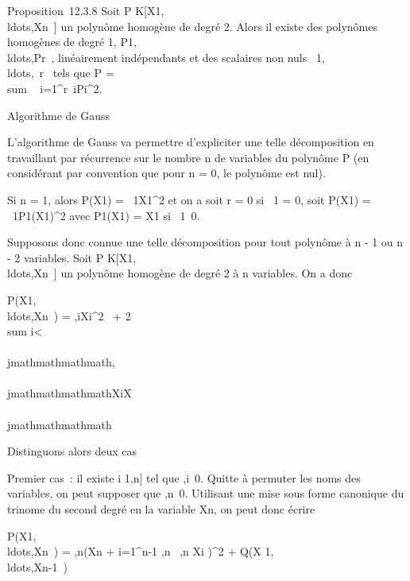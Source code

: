 Proposition~12.3.8 Soit P \in
K{[}X1,\\ldots,Xn~{]}
un polynôme homogène de degré 2. Alors il existe des polynômes homogènes
de degré 1,
P1,\\ldots,Pr~,
linéairement indépendants et des scalaires non nuls
\alpha~1,\\ldots,\alpha~r~
tels que P = \\sum ~
i=1^r\alpha~iPi^2.

Algorithme de Gauss

L'algorithme de Gauss va permettre d'expliciter une telle décomposition
en travaillant par récurrence sur le nombre n de variables du polynôme P
(en considérant par convention que pour n = 0, le polynôme est nul).

Si n = 1, alors P(X1) = \alpha~1X1^2 et
on a soit r = 0 si \alpha~1 = 0, soit P(X1) =
\alpha~1P1(X1)^2 avec
P1(X1) = X1 si
\alpha~1\neq~0.

Supposons donc connue une telle décomposition pour tout polynôme à n - 1
ou n - 2 variables. Soit P \in
K{[}X1,\\ldots,Xn~{]}
un polynôme homogène de degré 2 à n variables. On a donc

P(X1,\\ldots,Xn~)
= \sum \omegai,iXi^2~ +
2\\sum
i\textless{}\\\\jmathmathmathmath\omegai,\\\\jmathmathmathmathXiX\\\\jmathmathmathmath

Distinguons alors deux cas

Premier cas~: il existe i \in {[}1,n{]} tel que
\omegai,i\neq~0. Quitte à permuter les noms
des variables, on peut supposer que
\omegan,n\neq~0. Utilisant une mise sous
forme canonique du trinome du second degré en la variable Xn,
on peut donc écrire

P(X1,\\ldots,Xn~)
= \omegan,n\left (Xn +
\sum i=1^n-1 \omegai,n~
\over \omegan,n Xi\right
)^2 + Q(X
1,\\ldots,Xn-1~)

